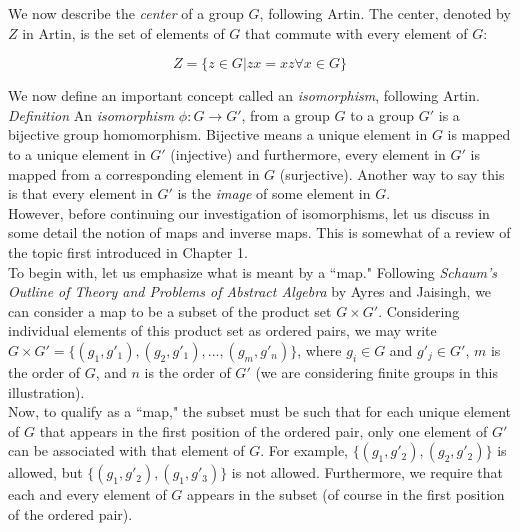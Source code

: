 We now describe the \textit{center} of a group $G$, following Artin.  The center, denoted by $Z$ in Artin, is the set of elements of $G$ that commute with every element of $G$:

\begin{displaymath}
Z=\{z \in G | zx = xz \forall x \in G \}
\end{displaymath}

We now define an important concept called an \textit{isomorphism}, following Artin.\\

\textit{Definition} An \textit{isomorphism} $\phi: G \rightarrow G'$, from a group $G$ to a group $G'$ is a bijective group homomorphism.  Bijective means a unique element in $G$ is mapped to a unique element in $G'$ (injective) and furthermore, every element in $G'$ is mapped from a corresponding element in $G$ (surjective).  Another way to say this is that every element in $G'$ is the \textit{image} of some element in $G$.\\

However, before continuing our investigation of isomorphisms, let us discuss in some detail the notion of maps and inverse maps.  This is somewhat of a review of the topic first introduced in Chapter 1.\\

To begin with, let us emphasize what is meant by a ``map."  Following \textit{Schaum's Outline of Theory and Problems of Abstract Algebra} by Ayres and Jaisingh, we can consider a map to be a subset of the product set $G \times G'$.  Considering individual elements of this product set as ordered pairs, we may write $G \times G' = \{ (g_{1}, g'_{1}), (g_{2}, g'_{1}), \ldots, (g_{m}, g'_{n}) \}$, where $g_{i} \in G$ and $g'_{j} \in G'$, $m$ is the order of $G$, and $n$ is the order of $G'$ (we are considering finite groups in this illustration).\\

Now, to qualify as a ``map," the subset must be such that for each unique element of $G$ that appears in the first position of the ordered pair, only one element of $G'$ can be associated with that element of $G$.  For example, $\{(g_{1}, g'_{2}), (g_{2}, g'_{2}) \}$ is allowed, but $\{(g_{1}, g'_{2}), (g_{1}, g'_{3}) \}$ is not allowed.  Furthermore, we require that each and every element of $G$ appears in the subset (of course in the first position of the ordered pair).\\  

